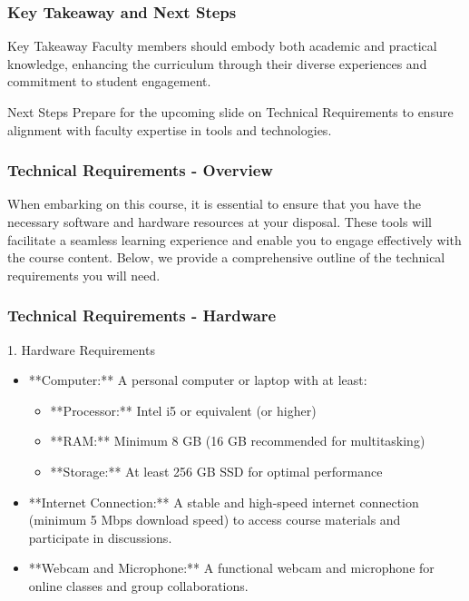 \documentclass[aspectratio=169]{beamer}
\begin{document}
\begin{frame}[fragile]
    \frametitle{Key Takeaway and Next Steps}
    \begin{block}{Key Takeaway}
        Faculty members should embody both academic and practical knowledge, enhancing the curriculum through their diverse experiences and commitment to student engagement.
    \end{block}
    \begin{block}{Next Steps}
        Prepare for the upcoming slide on Technical Requirements to ensure alignment with faculty expertise in tools and technologies.
    \end{block}
\end{frame}

\begin{frame}[fragile]
    \frametitle{Technical Requirements - Overview}
    When embarking on this course, it is essential to ensure that you have the necessary software and hardware resources at your disposal. These tools will facilitate a seamless learning experience and enable you to engage effectively with the course content. Below, we provide a comprehensive outline of the technical requirements you will need.
\end{frame}

\begin{frame}[fragile]
    \frametitle{Technical Requirements - Hardware}
    \begin{block}{1. Hardware Requirements}
        \begin{itemize}
            \item **Computer:** A personal computer or laptop with at least:
                \begin{itemize}
                    \item **Processor:** Intel i5 or equivalent (or higher)
                    \item **RAM:** Minimum 8 GB (16 GB recommended for multitasking)
                    \item **Storage:** At least 256 GB SSD for optimal performance
                \end{itemize}
            \item **Internet Connection:** A stable and high-speed internet connection (minimum 5 Mbps download speed) to access course materials and participate in discussions.
            \item **Webcam and Microphone:** A functional webcam and microphone for online classes and group collaborations.
        \end{itemize}
    \end{block}
\end{frame}
\end{document}
